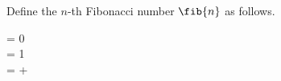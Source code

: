 \begin{definition}
  Define the $n$-th Fibonacci number $\fib{n}$ as follows.
  \begin{fundef}
     = 0 \\
     = 1 \\
     =  + 
  \end{fundef}


\end{definition}

